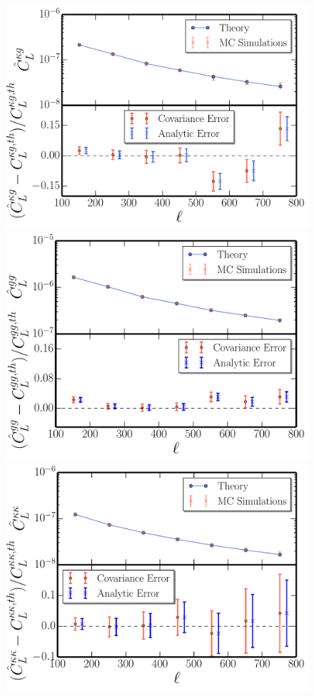 \begin{figure}
\centering
\includegraphics[scale=0.4]{Chapter3/Images/f6}\\
\includegraphics[scale=0.4]{Chapter3/Images/f7}\\
\includegraphics[scale=0.4]{Chapter3/Images/f8}

\end{figure}

